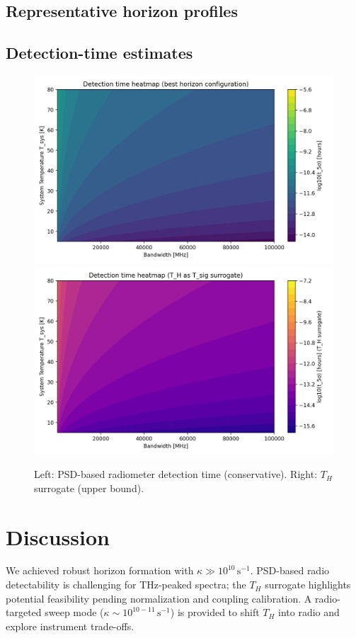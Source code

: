 \documentclass[11pt]{article}
\begin{document}
\subsection{Representative horizon profiles}

\subsection{Detection-time estimates}
\begin{figure}[h]
  \centering
  \includegraphics[width=0.48\linewidth]{figures/horizon_analysis_detection_time.png}\hfill
  \includegraphics[width=0.48\linewidth]{figures/horizon_analysis_detection_time_TH.png}
  \caption{Left: PSD-based radiometer detection time (conservative). Right: $T_H$ surrogate (upper bound).}
\end{figure}

\section{Discussion}
We achieved robust horizon formation with $\kappa\gg 10^{10}\,\mathrm{s^{-1}}$. PSD-based radio detectability is challenging for THz-peaked spectra; the $T_H$ surrogate highlights potential feasibility pending normalization and coupling calibration. A radio-targeted sweep mode ($\kappa \sim 10^{10-11}\,\mathrm{s^{-1}}$) is provided to shift $T_H$ into radio and explore instrument trade-offs.
\end{document}
